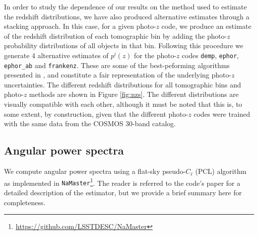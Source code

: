 \documentclass[a4paper,11pt]{article}
\begin{document}
    In order to study the dependence of our results on the method used to estimate the redshift distributions, we have also produced alternative estimates through a stacking approach. In this case, for a given photo-$z$ code, we produce an estimate of the redshift distribution of each tomographic bin by adding the photo-$z$ probability distributions of all objects in that bin. Following this procedure we generate 4 alternative estimates of $p^i(z)$ for the photo-$z$ codes {\tt demp}, {\tt ephor}, {\tt ephor\_ab} and {\tt frankenz}. These are some of the best-peforming algorithms presented in \cite{2018PASJ...70S...9T}, and constitute a fair representation of the underlying photo-$z$ uncertainties. The different redshift distributions for all tomographic bins and photo-$z$ methods are shown in Figure \ref{fig:nzs}. The different distributions are visually compatible with each other, although it must be noted that this is, to some extent, by construction, given that the different photo-$z$ codes were trained with the same data from the COSMOS 30-band catalog.

  \subsection{Angular power spectra}\label{ssec:methods.cell}
    We compute angular power spectra using a flat-sky pseudo-$C_\ell$ (PCL) algorithm \citep{2002ApJ...567....2H} as implemented in {\tt NaMaster}\footnote{\url{https://github.com/LSSTDESC/NaMaster}}. The reader is referred to the code's paper \cite{2019MNRAS.484.4127A} for a detailed description of the estimator, but we provide a brief summary here for completeness.
    
\end{document}

